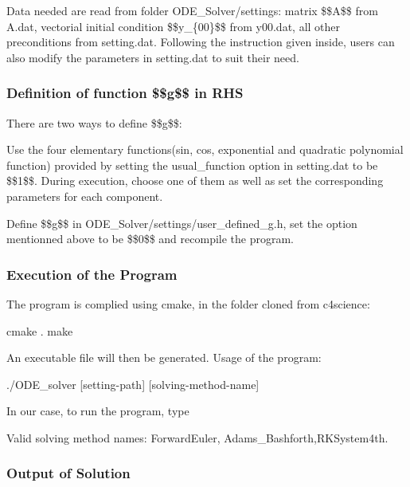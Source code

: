 Data needed are read from folder {\ttfamily O\+D\+E\+\_\+\+Solver/settings}\+: matrix \$\$A\$\$ from {\ttfamily A.\+dat}, vectorial initial condition \$\$y\+\_\+\{00\}\$\$ from {\ttfamily y00.\+dat}, all other preconditions from {\ttfamily setting.\+dat}. Following the instruction given inside, users can also modify the parameters in {\ttfamily setting.\+dat} to suit their need. \subsubsection*{Definition of function \$\$g\$\$ in R\+HS}

There are two ways to define \$\$g\$\$\+:
\begin{DoxyItemize}
\item Use the four elementary functions(sin, cos, exponential and quadratic polynomial function) provided by setting the {\ttfamily usual\+\_\+function} option in {\ttfamily setting.\+dat} to be \$\$1\$\$. During execution, choose one of them as well as set the corresponding parameters for each component.
\item Define \$\$g\$\$ in {\ttfamily O\+D\+E\+\_\+\+Solver/settings/user\+\_\+defined\+\_\+g.\+h}, set the option mentionned above to be \$\$0\$\$ and recompile the program.
\end{DoxyItemize}

\subsubsection*{Execution of the Program}

The program is complied using cmake, in the folder cloned from c4science\+: 
\begin{DoxyCode}
cmake .
make
\end{DoxyCode}
 An executable file will then be generated. Usage of the program\+: 
\begin{DoxyCode}
./ODE\_solver [setting-path] [solving-method-name]
\end{DoxyCode}
 In our case, to run the program, type 
 Valid solving method names\+: Forward\+Euler, Adams\+\_\+\+Bashforth,R\+K\+System4th.

\subsubsection*{Output of Solution}

